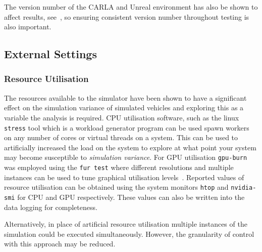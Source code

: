 \documentclass[letterpaper, 10 pt, journal, twoside]{IEEEtran}
\begin{document}
The version number of the CARLA and Unreal environment has also be shown to affect results, see~\cite{TSLUnrealEngineTesting}, so ensuring consistent version number throughout testing is also important.



\subsection{External Settings}

\subsubsection{Resource Utilisation}
The resources available to the simulator have been shown to have a significant effect on the simulation variance of simulated vehicles and exploring this as a variable the analysis is required. 
CPU utilisation software, such as the linux \texttt{stress} tool which is a workload generator program can be used spawn workers on any number of cores or virtual threads on a system. This can be used to artificially increased the load on the system to explore at what point your system may become susceptible to \textit{simulation variance}. For GPU utilisation \texttt{gpu-burn} was employed using the \texttt{fur test} where different resolutions and multiple instances can be used to tune graphical utilisation levels~\cite{GPU_stress}. Reported values of resource utilisation can be obtained using the system monitors \texttt{htop} and \texttt{nvidia-smi} for CPU and GPU respectively. These values can also be written into the data logging for completeness.

Alternatively, in place of artificial resource utilisation multiple instances of the simulation could be executed simultaneously. However, the granularity of control with this approach may be reduced.

\end{document}
